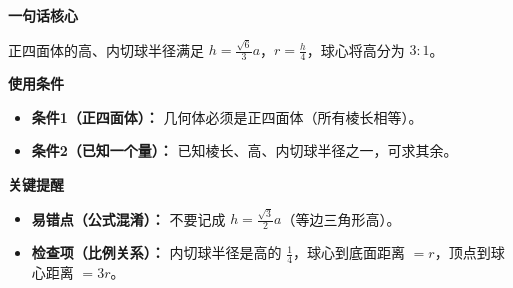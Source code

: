\begin{summarybox}
	\textbf{\textcolor{CSummary}{一句话核心}}

	正四面体的高、内切球半径满足 $h = \frac{\sqrt{6}}{3}a$，$r = \frac{h}{4}$，球心将高分为 $3:1$。

	\medskip
	\textbf{\textcolor{CSummary}{使用条件}}
	\begin{itemize}[leftmargin=*, itemsep=0.5em, topsep=0.4em]
		\item \textbf{条件1（正四面体）：} 几何体必须是正四面体（所有棱长相等）。
		\item \textbf{条件2（已知一个量）：} 已知棱长、高、内切球半径之一，可求其余。
	\end{itemize}

	\medskip
	\textbf{\textcolor{CSummary}{关键提醒}}
	\begin{itemize}[leftmargin=*, itemsep=0.5em, topsep=0.4em]
		\item \textbf{易错点（公式混淆）：} 不要记成 $h = \frac{\sqrt{3}}{2}a$（等边三角形高）。
		\item \textbf{检查项（比例关系）：} 内切球半径是高的 $\frac14$，球心到底面距离 $=r$，顶点到球心距离 $=3r$。
	\end{itemize}
\end{summarybox}
